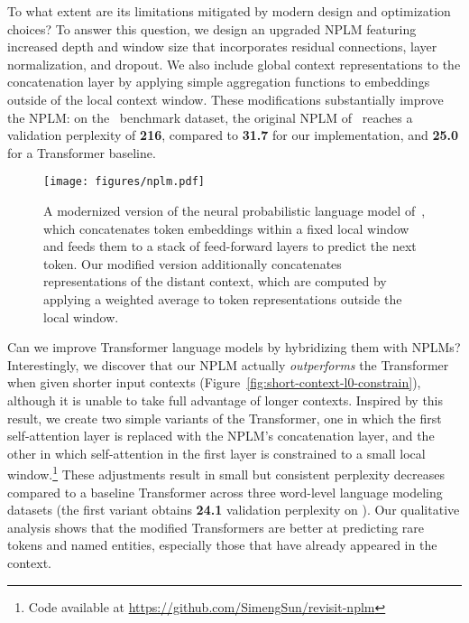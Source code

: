 \documentclass[11pt]{article}
\begin{document}
To what extent are its limitations mitigated by modern design and optimization choices?
To answer this question,  we design an upgraded NPLM featuring increased depth and window size  that incorporates residual connections, layer normalization, and dropout. We also include global context representations  to the concatenation layer by applying simple aggregation functions to embeddings outside of the local context window. These modifications substantially improve the NPLM: on the \wtthree\ benchmark dataset, the original NPLM of~\citet{Bengio2003ANP} reaches a validation perplexity of \textbf{216}, compared to \textbf{31.7} for our implementation, and \textbf{25.0} for a Transformer baseline.  

\begin{figure}[t]
    \texttt{[image: figures/nplm.pdf]}
    \caption{A modernized version of the neural probabilistic language model of~\citet{Bengio2003ANP}, which concatenates token embeddings within a fixed local window and feeds them to a stack of feed-forward layers to predict the next token. Our modified version additionally concatenates representations of the  distant context, which are computed by applying a weighted average to token representations outside the local window.}
    \label{fig:nplm}
\end{figure}

Can we improve Transformer language models by hybridizing them with NPLMs? Interestingly, we discover that our NPLM actually \emph{outperforms} the Transformer when given shorter input contexts (Figure~\ref{fig:short-context-l0-constrain}), although it is unable to take full advantage of longer contexts. Inspired by this result, we create two simple variants of the Transformer, one in which the first self-attention layer is replaced with the NPLM's concatenation layer, and the other in which self-attention in the first layer is constrained to a small local window.\footnote{Code available at \url{https://github.com/SimengSun/revisit-nplm}} These adjustments result in small but consistent perplexity decreases compared to a baseline Transformer across three word-level language modeling datasets (the first variant obtains \textbf{24.1} validation perplexity on \wtthree). Our qualitative analysis shows that the modified Transformers are better at predicting rare tokens and named entities, especially those that have already appeared in the context. 
\end{document}
